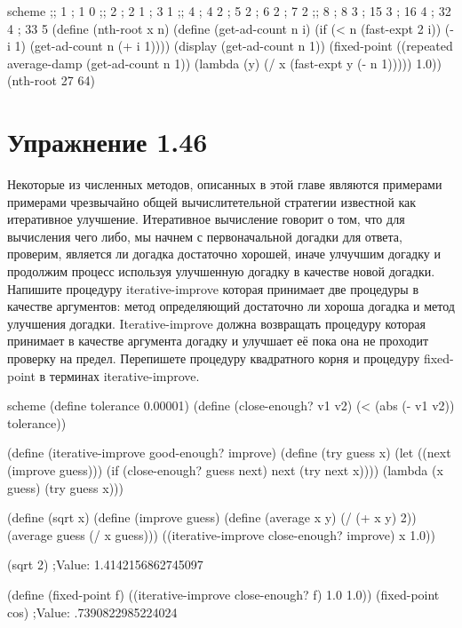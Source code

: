 \begin{codelisting}{scheme}
;; 1 ; 1 0
;; 2 ; 2 1
     ; 3 1
;; 4 ; 4 2
     ; 5 2
     ; 6 2
     ; 7 2
;; 8 ; 8 3
     ; 15 3
     ; 16 4
     ; 32 4
     ; 33 5
(define (nth-root x n)
  (define (get-ad-count n i)
    (if (< n (fast-expt 2 i))
        (- i 1)
        (get-ad-count n (+ i 1))))
  (display (get-ad-count n 1))
  (fixed-point ((repeated average-damp (get-ad-count n 1)) (lambda (y) (/ x (fast-expt y (- n 1)))))
               1.0))
(nth-root 27 64)
\end{codelisting}

\chapter{Упражнение 1.46}

Некоторые из численных методов, описанных в этой главе являются примерами примерами чрезвычайно общей вычислитетельной стратегии известной как итеративное улучшение. Итеративное вычисление говорит о том, что для вычисления чего либо, мы начнем с первоначальной догадки для ответа, проверим, является ли догадка достаточно хорошей, иначе улчучшим догадку и продолжим процесс используя улучшенную догадку в качестве новой догадки. Напишите процедуру iterative-improve которая принимает две процедуры в качестве аргументов: метод определяющий достаточно ли хороша догадка и метод улучшения догадки. Iterative-improve должна возвращать процедуру которая принимает в качестве аргумента догадку и улучшает её пока она не проходит проверку на предел. Перепишете процедуру квадратного корня и процедуру fixed-point в терминах iterative-improve.

\begin{codelisting}{scheme}
(define tolerance 0.00001)
(define (close-enough? v1 v2)
  (< (abs (- v1 v2)) tolerance))

(define (iterative-improve good-enough? improve)
  (define (try guess x)
    (let ((next (improve guess)))
      (if (close-enough? guess next)
          next
          (try next x))))
  (lambda (x guess) (try guess x)))

(define (sqrt x)
  (define (improve guess)
    (define (average x y)
      (/ (+ x y) 2))
    (average guess (/ x guess)))
  ((iterative-improve close-enough? improve) x 1.0))

(sqrt 2) ;Value: 1.4142156862745097


(define (fixed-point f)
  ((iterative-improve close-enough? f) 1.0 1.0))
(fixed-point cos) ;Value: .7390822985224024
\end{codelisting}